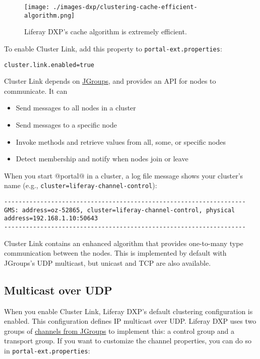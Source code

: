 \begin{figure}
\centering
\texttt{[image: ./images-dxp/clustering-cache-efficient-algorithm.png]}
\caption{Liferay DXP's cache algorithm is extremely efficient.}
\end{figure}

To enable Cluster Link, add this property to
\texttt{portal-ext.properties}:

\begin{verbatim}
cluster.link.enabled=true
\end{verbatim}

Cluster Link depends on \href{http://www.jgroups.org}{JGroups}, and
provides an API for nodes to communicate. It can

\begin{itemize}
\tightlist
\item
  Send messages to all nodes in a cluster
\item
  Send messages to a specific node
\item
  Invoke methods and retrieve values from all, some, or specific nodes
\item
  Detect membership and notify when nodes join or leave
\end{itemize}

When you start @portal@ in a cluster, a log file message shows your
cluster's name (e.g., \texttt{cluster=liferay-channel-control}):

\begin{verbatim}
------------------------------------------------------------------- 
GMS: address=oz-52865, cluster=liferay-channel-control, physical address=192.168.1.10:50643 
-------------------------------------------------------------------
\end{verbatim}

Cluster Link contains an enhanced algorithm that provides one-to-many
type communication between the nodes. This is implemented by default
with JGroups's UDP multicast, but unicast and TCP are also available.

\subsection{Multicast over UDP}\label{multicast-over-udp}

When you enable Cluster Link, Liferay DXP's default clustering
configuration is enabled. This configuration defines IP multicast over
UDP. Liferay DXP uses two groups of
\href{http://www.jgroups.org/manual/index.html\#_channel}{channels from
JGroups} to implement this: a control group and a transport group. If
you want to customize the channel properties, you can do so in
\texttt{portal-ext.properties}:

